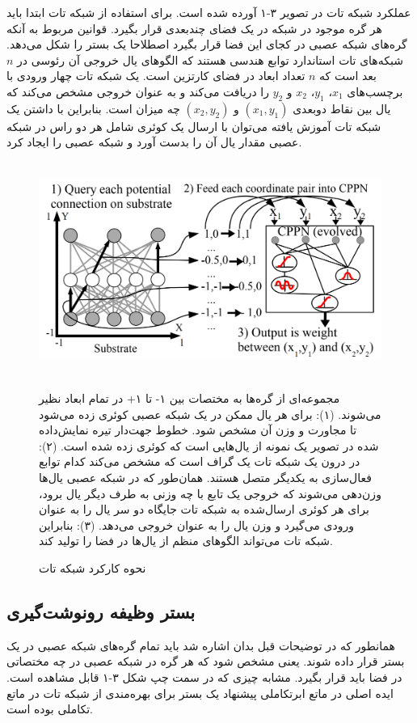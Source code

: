 عملکرد شبکه تات در تصویر ۳-۱ آورده شده است. برای استفاده از شبکه تات ابتدا باید هر گره موجود در شبکه در یک فضای چندبعدی قرار بگیرد. قوانین مربوط به آنکه گره‌های شبکه عصبی در کجای این فضا قرار بگیرد اصطلاحا یک بستر را شکل می‌دهد. شبکه‌های تات استاندارد توابع هندسی هستند که الگوهای یال خروجی آن رئوسی در $n$ بعد است که $n$ تعداد ابعاد در فضای کارتزین است. یک شبکه تات چهار ورودی با برچسب‌های $x_1$، $y_1$، $x_2$ و $y_2$ را دریافت می‌کند و به عنوان خروجی مشخص می‌کند که یال بین نقاط دوبعدی $(x_1, y_1)$ و $(x_2, y_2)$ چه میزان است. بنابراین با داشتن یک شبکه تات آموزش یافته می‌توان با ارسال یک کوئری شامل هر دو راس در شبکه عصبی مقدار یال آن را بدست آورد و شبکه عصبی را ایجاد کرد.\cite{merrild2018hyperntm}

\begin{figure}[!h]
\begin{center}
\includegraphics[height=7cm]{CPPN.png}
\end{center}
\caption{نحوه کارکرد شبکه تات\cite{merrild2018hyperntm}}
\medskip
\small
مجموعه‌ای از گره‌ها به مختصات بین ۱- تا ۱+ در تمام ابعاد نظیر می‌شوند.
(۱): برای هر یال ممکن در یک شبکه عصبی کوئری زده می‌شود تا مجاورت و وزن آن مشخص شود. خطوط جهت‌دار تیره نمایش‌داده شده در تصویر یک نمونه از یال‌هایی است که کوئری زده شده است.
(۲): در درون یک شبکه تات یک گراف است که مشخص می‌کند کدام توابع فعال‌سازی به یکدیگر متصل هستند. همان‌طور که در شبکه عصبی یال‌ها وزن‌دهی می‌شوند که خروجی یک تابع با چه وزنی به طرف دیگر یال برود، برای هر کوئری ارسال‌شده به شبکه تات جایگاه دو سر یال را به عنوان ورودی می‌گیرد و وزن یال را به عنوان خروجی می‌دهد. (۳): بنابراین شبکه تات می‌تواند الگوهای منظم از یال‌ها در فضا را تولید کند.\cite{merrild2018hyperntm}

\end{figure}

\subsection{بستر وظیفه رونوشت‌گیری}
همانطور که در توضیحات قبل بدان اشاره شد باید تمام گره‌های شبکه عصبی در یک بستر قرار داده شوند. یعنی مشخص شود که هر گره در شبکه عصبی در چه مختصاتی در فضا باید قرار بگیرد. مشابه چیزی که در سمت چپ شکل ۳-۱ قابل مشاهده است. ایده اصلی در ماتع ابرتکاملی پیشنهاد یک بستر برای بهره‌مندی از شبکه تات در ماتع تکاملی بوده است.
\\

